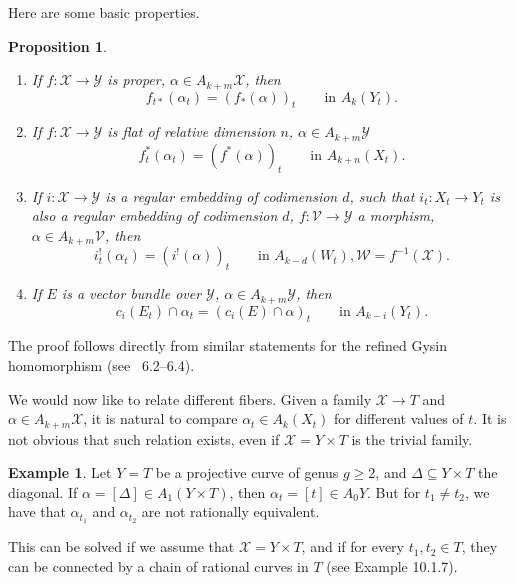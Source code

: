 \documentclass[leqno, openany]{memoir}
\newtheorem{prop}[thm]{Proposition}
\theoremstyle{definition}
\newtheorem{exm}[thm]{Example}
\theoremstyle{remark}
\theoremstyle{plain}
\theoremstyle{definition}
\theoremstyle{remark}
\newcommand{\mc}[1]{\mathcal{#1}}
\begin{document}
Here are some basic properties.
\begin{prop}\label{prop:basicprop}
\begin{enumerate}
\item If $f\colon \mc{X} \to \mc{Y}$ is proper, $\alpha \in A_{k+m}\mc{X}$, then
\[ f_{t\ast}(\alpha_t)={ (f_\ast(\alpha)) }_t \qquad \text{in }A_k(Y_t). \]

\item If $f\colon \mc{X} \to \mc{Y}$ is flat of relative dimension $n$, $\alpha \in A_{k+m}\mc{Y}$
\[ f_t^\ast(\alpha_t)={ (f^\ast(\alpha)) }_t \qquad \text{in }A_{k+n}(X_t). \]

\item If $i\colon \mc{X} \to \mc{Y}$ is a regular embedding of codimension $d$, such that $i_t\colon X_t \to Y_t$ is also a regular embedding of codimension $d$, $f\colon \mc{V} \to \mc{Y}$ a morphism, $\alpha \in A_{k+m}\mc{V}$, then
\[ i_t^!(\alpha_t)={ (i^!(\alpha)) }_t \qquad \text{in } A_{k-d}(W_t), \mc{W}=f^{-1}(\mc{X}). \]
\end{enumerate}
\begin{enumerate} \setcounter{enumi}{3}
\item If $E$ is a vector bundle over $\mc{Y}$, $\alpha \in A_{k+m} \mc{Y}$, then 
\[ c_i(E_t) \cap \alpha_t = { (c_i(E) \cap \alpha) }_t \qquad \text{in }A_{k-i}(Y_t). \]
\end{enumerate}
\end{prop}

The proof follows directly from similar statements for the refined Gysin homomorphism (see \textsection~6.2--6.4).

We would now like to relate different fibers. Given a family $\mc{X} \to T$ and $\alpha \in A_{k+m}\mc{X}$, it is natural to compare $\alpha_t \in A_k(X_t)$ for different values of $t$. It is not obvious that such relation exists, even if $\mc{X}=Y \times T$ is the trivial family.

\begin{exm}
Let $Y=T$ be a projective curve of genus $g \geq 2$, and $\Delta\subseteq Y \times T$ the diagonal. If $\alpha = [\Delta] \in A_1(Y \times T)$, then $\alpha_t = [t] \in A_0 Y$. But for $t_1 \neq t_2$, we have that $\alpha_{t_1}$ and $\alpha_{t_2}$ are not rationally equivalent. 
\end{exm}

This can be solved if we assume that $\mc{X}=Y \times T$, and if for every $t_1, t_2 \in T$, they can be connected by a chain of rational curves in $T$ (see Example 10.1.7).
\end{document}
